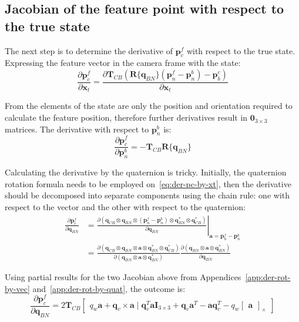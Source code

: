 \subsection*{Jacobian of the feature point with respect to the true state} 

The next step is to determine the derivative of $\mathbf{p}_c^f$ with respect to the true state. Expressing the feature vector in the camera frame with the state:
\begin{equation}
    \frac{\partial\mathbf{p}_c^f}{\partial\mathbf{x}_t}=
    \frac{\partial\mathbf{T}_{CB}\left(\mathbf{R}\{\mathbf{q}_{BN}\}(\mathbf{p}_n^f-\mathbf{p}_n^b)-\mathbf{p}_b^c\right)}{\partial\mathbf{x}_t}
    \label{eq:der-pc-by-xt}
\end{equation}

From the elements of the state are only the position and orientation required to calculate the feature position, therefore further derivatives result in $\mathbf{0}_{3\times 3}$ matrices. The derivative with respect to $\mathbf{p}_n^b$ is:
\begin{equation}
    \frac{\partial\mathbf{p}_c^f}{\partial\mathbf{p}_n^b}=-\mathbf{T}_{CB}\mathbf{R}\{\mathbf{q}_{BN}\}
\end{equation}

Calculating the derivative by the quaternion is tricky. Initially, the quaternion rotation formula needs to be employed on~\eqref{eq:der-pc-by-xt}, then the derivative should be decomposed into separate components using the chain rule: one with respect to the vector and the other with respect to the quaternion:
\begin{equation}
\begin{aligned}
    \frac{\partial\mathbf{p}_c^f}{\partial\mathbf{q}_{BN}}&=\left.
    \frac{\partial\left(\mathbf{q}_{CB}\otimes\mathbf{q}_{BN}\otimes(\mathbf{p}_n^f-\mathbf{p}_n^b) \otimes\mathbf{q}_{BN}^*\otimes\mathbf{q}_{CB}^*\right)}{\partial\mathbf{q}_{BN}} \right\vert_{\mathbf{a}=\mathbf{p}_n^f-\mathbf{p}_n^b} \\ 
    &=\frac{\partial\left(\mathbf{q}_{CB}\otimes\mathbf{q}_{BN}\otimes\mathbf{a} \otimes\mathbf{q}_{BN}^*\otimes\mathbf{q}_{CB}^*\right)}{\partial\left(\mathbf{q}_{BN}\otimes\mathbf{a} \otimes\mathbf{q}_{BN}^*\right)}
    \frac{\partial\left(\mathbf{q}_{BN}\otimes\mathbf{a}\otimes\mathbf{q}_{BN}^*\right)}{\partial\mathbf{q}_{BN}}
\end{aligned}
\end{equation}

Using partial results for the two Jacobian above from Appendices~\ref{app:der-rot-by-vec} and~\ref{app:der-rot-by-quat}, the outcome is:
\begin{equation}
    \frac{\partial\mathbf{p}_c^f}{\partial\mathbf{q}_{BN}}=2\mathbf{T}_{CB}\begin{bmatrix}
        q_w\mathbf{a}+\mathbf{q}_v\times\mathbf{a}\; | \;\mathbf{q}_v^T\mathbf{a}\mathbf{I}_{3\times 3}+\mathbf{q}_v\mathbf{a}^T-\mathbf{a}\mathbf{q}_v^T-q_w\begin{bmatrix}
            \mathbf{a}
        \end{bmatrix}_\times
    \end{bmatrix}
\end{equation}

